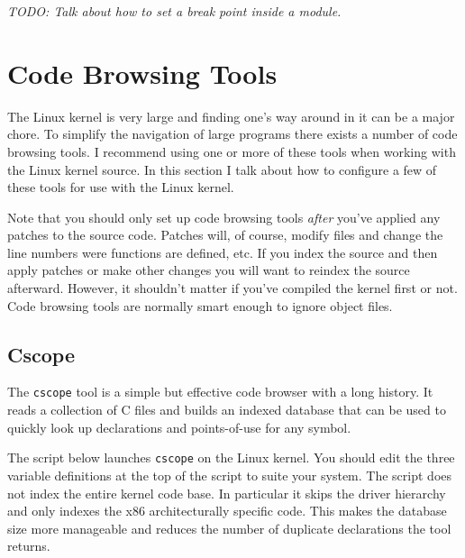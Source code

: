 \documentclass{article}
\newcommand{\command}[1]{\texttt{#1}}
\newcommand{\todo}[1]{\textit{TODO: #1}}
\begin{document}
\todo{Talk about how to set a break point inside a module.}

\section{Code Browsing Tools}
\label{sec:code-browsing}

The Linux kernel is very large and finding one's way around in it can be a major chore. To
simplify the navigation of large programs there exists a number of code browsing tools. I
recommend using one or more of these tools when working with the Linux kernel source. In this
section I talk about how to configure a few of these tools for use with the Linux kernel.

Note that you should only set up code browsing tools \emph{after} you've applied any patches to
the source code. Patches will, of course, modify files and change the line numbers were
functions are defined, etc. If you index the source and then apply patches or make other changes
you will want to reindex the source afterward. However, it shouldn't matter if you've compiled
the kernel first or not. Code browsing tools are normally smart enough to ignore object files.

\subsection{Cscope}

The \command{cscope} tool is a simple but effective code browser with a long history. It reads a
collection of C files and builds an indexed database that can be used to quickly look up
declarations and points-of-use for any symbol.

The script below launches \command{cscope} on the Linux kernel. You should edit the three
variable definitions at the top of the script to suite your system. The script does not index
the entire kernel code base. In particular it skips the driver hierarchy and only indexes the
x86 architecturally specific code. This makes the database size more manageable and reduces the
number of duplicate declarations the tool returns.
\end{document}
